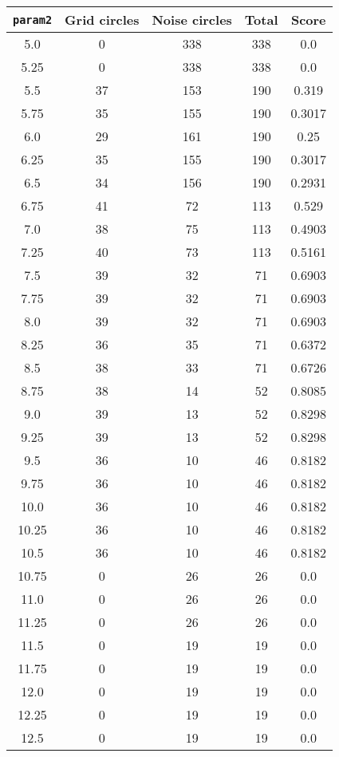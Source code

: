 \documentclass[letterpaper, 12pt]{article}
\begin{document}
\begin{longtable}{|c|c|c|c|c|}
\hline
\textbf{\texttt{param2}} & \textbf{Grid circles} & \textbf{Noise circles} & \textbf{Total} & \textbf{Score} \\
\hline
5.0 & 0 & 338 & 338 & 0.0 \\
\hline
5.25 & 0 & 338 & 338 & 0.0 \\
\hline
5.5 & 37 & 153 & 190 & 0.319 \\
\hline
5.75 & 35 & 155 & 190 & 0.3017 \\
\hline
6.0 & 29 & 161 & 190 & 0.25 \\
\hline
6.25 & 35 & 155 & 190 & 0.3017 \\
\hline
6.5 & 34 & 156 & 190 & 0.2931 \\
\hline
6.75 & 41 & 72 & 113 & 0.529 \\
\hline
7.0 & 38 & 75 & 113 & 0.4903 \\
\hline
7.25 & 40 & 73 & 113 & 0.5161 \\
\hline
7.5 & 39 & 32 & 71 & 0.6903 \\
\hline
7.75 & 39 & 32 & 71 & 0.6903 \\
\hline
8.0 & 39 & 32 & 71 & 0.6903 \\
\hline
8.25 & 36 & 35 & 71 & 0.6372 \\
\hline
8.5 & 38 & 33 & 71 & 0.6726 \\
\hline
8.75 & 38 & 14 & 52 & 0.8085 \\
\hline
9.0 & 39 & 13 & 52 & 0.8298 \\
\hline
9.25 & 39 & 13 & 52 & 0.8298 \\
\hline
9.5 & 36 & 10 & 46 & 0.8182 \\
\hline
9.75 & 36 & 10 & 46 & 0.8182 \\
\hline
10.0 & 36 & 10 & 46 & 0.8182 \\
\hline
10.25 & 36 & 10 & 46 & 0.8182 \\
\hline
10.5 & 36 & 10 & 46 & 0.8182 \\
\hline
10.75 & 0 & 26 & 26 & 0.0 \\
\hline
11.0 & 0 & 26 & 26 & 0.0 \\
\hline
11.25 & 0 & 26 & 26 & 0.0 \\
\hline
11.5 & 0 & 19 & 19 & 0.0 \\
\hline
11.75 & 0 & 19 & 19 & 0.0 \\
\hline
12.0 & 0 & 19 & 19 & 0.0 \\
\hline
12.25 & 0 & 19 & 19 & 0.0 \\
\hline
12.5 & 0 & 19 & 19 & 0.0 \\

\end{longtable}
\end{document}
